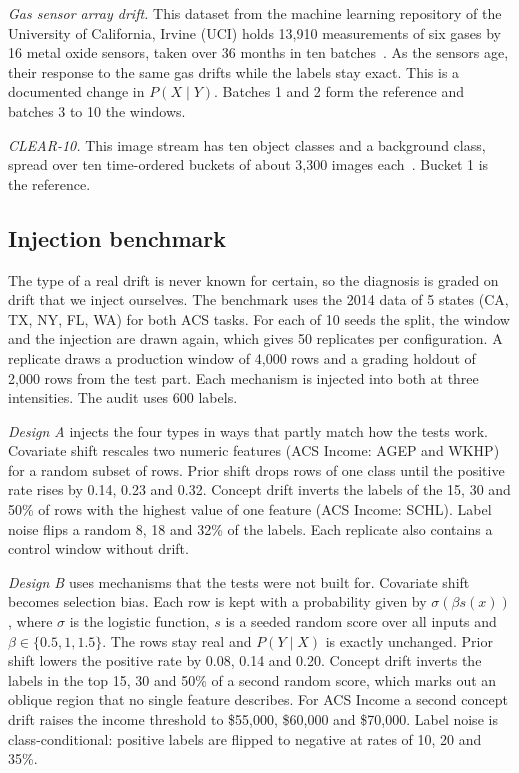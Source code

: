 \documentclass[pdflatex,sn-mathphys-num]{sn-jnl}
\begin{document}
\emph{Gas sensor array drift.} This dataset from the machine learning repository of the University of California, Irvine (UCI) holds 13,910 measurements of six gases by 16 metal oxide sensors, taken over 36 months in ten batches~\cite{vergara2012gas}. As the sensors age, their response to the same gas drifts while the labels stay exact. This is a documented change in $P(X\mid Y)$. Batches 1 and 2 form the reference and batches 3 to 10 the windows.

\emph{CLEAR-10.} This image stream has ten object classes and a background class, spread over ten time-ordered buckets of about 3,300 images each~\cite{lin2021clear}. Bucket 1 is the reference.

\subsection{Injection benchmark}\label{sec:benchmark-setup}

The type of a real drift is never known for certain, so the diagnosis is graded on drift that we inject ourselves. The benchmark uses the 2014 data of 5 states (CA, TX, NY, FL, WA) for both ACS tasks. For each of 10 seeds the split, the window and the injection are drawn again, which gives 50 replicates per configuration. A replicate draws a production window of 4,000 rows and a grading holdout of 2,000 rows from the test part. Each mechanism is injected into both at three intensities. The audit uses 600 labels.

\emph{Design A} injects the four types in ways that partly match how the tests work. Covariate shift rescales two numeric features (ACS Income: AGEP and WKHP) for a random subset of rows. Prior shift drops rows of one class until the positive rate rises by 0.14, 0.23 and 0.32. Concept drift inverts the labels of the 15, 30 and 50\% of rows with the highest value of one feature (ACS Income: SCHL). Label noise flips a random 8, 18 and 32\% of the labels. Each replicate also contains a control window without drift.

\emph{Design B} uses mechanisms that the tests were not built for. Covariate shift becomes selection bias. Each row is kept with a probability given by $\sigma(\beta s(x))$, where $\sigma$ is the logistic function, $s$ is a seeded random score over all inputs and $\beta\in\{0.5, 1, 1.5\}$. The rows stay real and $P(Y\mid X)$ is exactly unchanged. Prior shift lowers the positive rate by 0.08, 0.14 and 0.20. Concept drift inverts the labels in the top 15, 30 and 50\% of a second random score, which marks out an oblique region that no single feature describes. For ACS Income a second concept drift raises the income threshold to \$55,000, \$60,000 and \$70,000. Label noise is class-conditional: positive labels are flipped to negative at rates of 10, 20 and 35\%.
\end{document}
